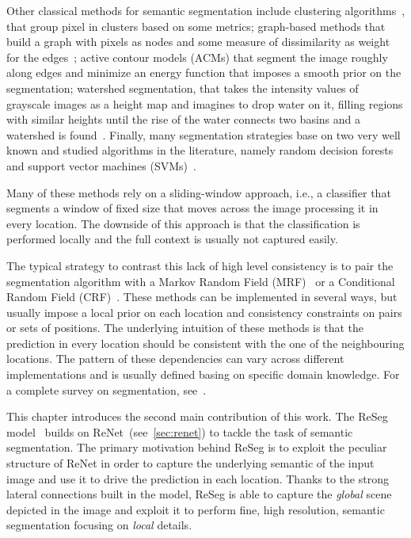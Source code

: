 Other classical methods for semantic segmentation include clustering
algorithms~\citep[see e.g.,~][]{hartigan1975clustering,chen1998image}, that
group pixel in clusters based on some metrics; graph-based
methods that build a graph with pixels as nodes and some measure of
dissimilarity as weight for the edges~\citep[see e.g.,~][]{
carreira2010constrained,felzenszwalb2004efficient}; active contour models
(ACMs) that segment the image roughly along edges and minimize an energy
function that imposes a smooth prior on the segmentation\citep[see e.g.,~][]{
atkins1998fully,kass1988snakes}; watershed segmentation, that takes the
intensity values of grayscale images as a height map and imagines to drop water
on it, filling regions with similar heights until the rise of the water
connects two basins and a watershed is found~\citep[see e.g.,~][]{
roerdink2000watershed}. Finally, many segmentation strategies base on two very
well known and studied algorithms in the literature, namely random decision
forests~\citep{ho1995random,shotton2008semantic} and support vector machines
(SVMs)~\citep{burges1998tutorial,yang2012layered}.

Many of these methods rely on a sliding-window approach, i.e., a classifier
that segments a window of fixed size that moves across the image processing it
in every location. The downside of this approach is that the classification is
performed locally and the full context is usually not captured easily.

The typical strategy to contrast this lack of high level consistency is to pair the
segmentation algorithm with a Markov Random Field (MRF)~\citep[see e.g.,~][]{
blake2011markov,MurphyBook2012,moser2012markov} or a Conditional Random
Field (CRF)~\citep[see e.g.,~][]{russell2009associative, he2004multiscale,
shotton2006textonboost}. These methods can be implemented in several ways, but
usually impose a local prior on each location and consistency constraints on
pairs or sets of positions. The underlying intuition of these methods is that
the prediction in every location should be consistent with the one of the
neighbouring locations. The pattern of these dependencies can vary across
different implementations and is usually defined basing on specific domain
knowledge. For a complete survey on segmentation, see~\cite{thoma2016survey}.

This chapter introduces the second main contribution of this work. The ReSeg
model~\cite{Visin_2016_CVPR_Workshops} builds on
ReNet~(see~\autoref{sec:renet}) to tackle the task of semantic segmentation.
The primary motivation behind ReSeg is to exploit the peculiar structure of
ReNet in order to capture the underlying semantic of the input image and use it
to drive the prediction in each location. Thanks to the strong lateral
connections built in the model, ReSeg is able to capture the \emph{global}
scene depicted in the image and exploit it to perform fine, high resolution,
semantic segmentation focusing on \emph{local} details.

